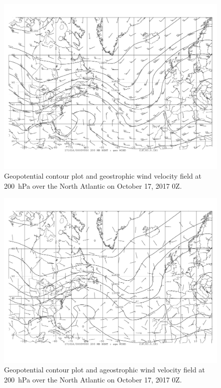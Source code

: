 \documentclass[11pt]{article}
\begin{document}
\begin{figure}[h!]
	\centering
	\includegraphics[trim={0.5cm 2cm 0.5cm 0},clip,width=\textwidth]{200hPa_hght_geowind_jet_inout}
	\caption{Geopotential contour plot and geostrophic wind velocity field at \SI{200}{\hecto\Pa} over the North Atlantic on October 17, 2017 0Z.}
	\label{fig:jet_geo}
\end{figure}

\begin{figure}[h!]
	\centering
	\includegraphics[trim={0.5cm 2cm 0.5cm 0},clip,width=\textwidth]{200hPa_hght_agewind_jet_inout}
	\caption{Geopotential contour plot and ageostrophic wind velocity field at \SI{200}{\hecto\Pa} over the North Atlantic on October 17, 2017 0Z.}
	\label{fig:jet_age}
\end{figure}
\end{document}
